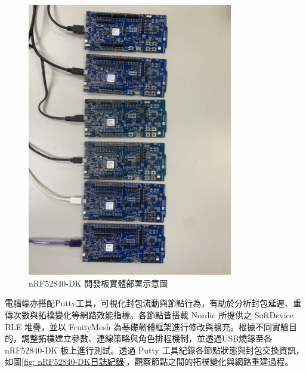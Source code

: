 \begin{ZhChapter}

\begin{figure}[H]
  \centering
  \includegraphics[width = 0.8\textwidth]{image/nRF52840開發板擺放示意圖.jpg}
  \caption{nRF52840-DK 開發板實體部署示意圖}
  \label{fig: nRF52840開發板擺放示意圖}
\end{figure}

電腦端亦搭配Putty工具，可視化封包流動與節點行為，有助於分析封包延遲、重傳次數與拓樸變化等網路效能指標。各節點皆搭載 Nordic 所提供之 SoftDevice BLE 堆疊，並以 FruityMesh 為基礎韌體框架進行修改與擴充。根據不同實驗目的，調整拓樸建立參數、連線策略與角色排程機制，並透過USB燒錄至各 nRF52840-DK 板上進行測試。透過 Putty 工具紀錄各節點狀態與封包交換資訊，如圖\ref{fig: nRF52840-DK日誌紀錄}，觀察節點之間的拓樸變化與網路重建過程。


\end{ZhChapter}
